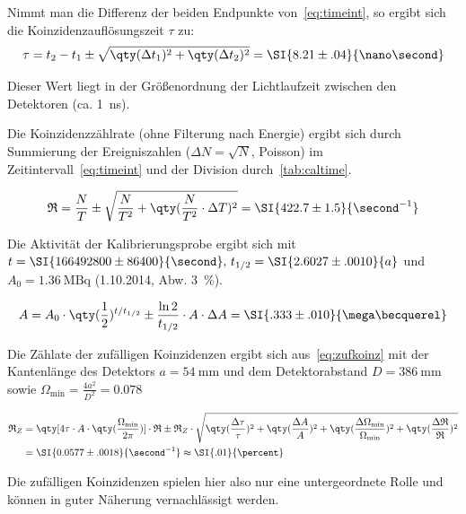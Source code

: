 \documentclass[slug=PET, room=Andreas-Schubert-Bau\,\ 424A,
supervisor=Carsten\ Bittrich, coursedate=10.\ 01.\ 2020, ngerman]{../../Lab_Report_LaTeX/lab_report}
\begin{document}
Nimmt man die Differenz der beiden Endpunkte von~\eqref{eq:timeint}, so
ergibt sich die Koinzidenzaufl\"osungszeit \(\tau\) zu:
\begin{equation}
  \label{eq:koauf}
  \tau = t_2 - t_1 \pm \sqrt{\qty(\Delta t_1)^2 + \qty(\Delta t_2)^2}
  = \SI{8.21\pm .04}{\nano\second}
\end{equation}

Dieser Wert liegt in der Gr\"o\ss{}enordnung der Lichtlaufzeit
zwischen den Detektoren (ca. \SI{1}{\nano\second}).

Die Koinzidenzz\"ahlrate (ohne Filterung nach Energie) ergibt sich
durch Summierung der Ereigniszahlen (\(\Delta N = \sqrt{N}\),
Poisson) im Zeitintervall~\eqref{eq:timeint} und der Division
durch~\eqref{tab:caltime}.

\begin{equation}
  \label{eq:ctrate}
  \mathfrak{R} = \frac{N}{T} \pm \sqrt{\frac{N}{T^2} +
    \qty(\frac{N}{T^2}\cdot \Delta T)^2} = \SI{422.7\pm 1.5}{\second^{-1}}
\end{equation}

Die Aktivität der  Kalibrierungsprobe ergibt sich mit
\(t=\SI{166492800\pm 86400}{\second},\, t_{1/2} = \SI{2.6027\pm .0010}{a}\) und \(A_0
= \SI{1.36}{\mega\becquerel}\) (1.10.2014, Abw. \SI{3}{\percent}).

\begin{equation}
  \label{eq:acttoday}
  A = A_0\cdot \qty(\frac{1}{2})^{t/t_{1/2}} \pm
  \frac{\ln{2}}{t_{1/2}}\cdot A\cdot\Delta A = \SI{.333\pm.010}{\mega\becquerel}
\end{equation}

Die Z\"ahlate der zuf\"alligen Koinzidenzen ergibt sich aus~\eqref{eq:zufkoinz}
mit der Kantenl\"ange des Detektors
\(a=\SI{54}{\milli\meter}\) und dem Detektorabstand
\(D=\SI{386}{\milli\meter}\) sowie
\(\Omega_{\min} = \frac{4a^2}{D^2} = 0.078\)

\begin{align}
  \label{eq:incidentalrate}
  \mathfrak{R}_Z &= \qty[4\tau\cdot A\cdot
  \qty(\frac{\Omega_{\min}}{2\pi})]\cdot \mathfrak{R} \pm \mathfrak{R}_Z\cdot
  \sqrt{\qty(\frac{\Delta\tau}{\tau})^2 + \qty(\frac{\Delta A}{A})^2 +
    \qty(\frac{\Delta\Omega_{\min}}{\Omega_{\min}})^2 +
                   \qty(\frac{\Delta\mathfrak{R}}{\mathfrak{R}})^2} \\
                 &= \SI{0.0577\pm .0018}{\second^{-1}} \approx \SI{.01}{\percent}
\end{align}

Die zuf\"alligen Koinzidenzen spielen hier also nur eine
untergeordnete Rolle und k\"onnen in guter N\"aherung vernachl\"assigt
werden.
\end{document}
